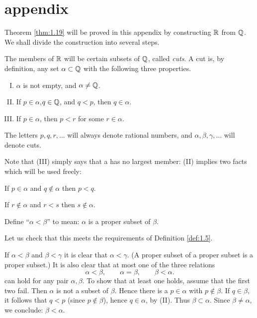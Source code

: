 \section*{appendix}
Theorem \ref{thm:1.19} will be proved in this appendix 
by constructing ${\protect\mathbb R}$ from ${\protect\mathbb Q}$. 
We shall divide the construction into several steps.

The members of ${\protect\mathbb R}$ will be certain subsets of ${\protect\mathbb Q}$, called \emph{cuts}. 
A cut is, by definition, 
any set $\alpha \subset {\protect\mathbb Q}$ with the following three properties.
\begin{enumerate}[(I)]
    \item $\alpha$ is not empty, and $\alpha \neq {\protect\mathbb Q}$.
    \item If $p\in \alpha$,$q \in {\protect\mathbb Q}$, and $q <p$, then $q \in \alpha$.
    \item If $p \in \alpha$, then $p <r$ for some $r\in \alpha$.
\end{enumerate}

The letters $p, q, r, ...$ will always denote rational numbers, 
and $\alpha, \beta, \gamma, ...$ will denote cuts.

Note that (III) simply says that a has no largest member: 
(II) implies two facts which will be used freely:

If $p\in\alpha$ and $q\not\in\alpha$ then $p<q$.

If $r\not\in \alpha$ and $r<s$ then $s\not\in \alpha$.

Define ``$\alpha < \beta$'' to mean: 
$\alpha$ is a proper subset of $\beta$.

Let us check that this meets the requirements of Definition \ref{def:1.5}.

If $\alpha < \beta$ and $\beta < \gamma$ it is clear that $\alpha < \gamma$. 
(A proper subset of a proper subset is a proper subset.) 
It is also clear that at most one of the three relations
\begin{equation*}
    \alpha < \beta, \qquad
    \alpha = \beta, \qquad
    \beta < \alpha.
\end{equation*}
can hold for any pair $\alpha, \beta$. 
To show that at least one holds, assume that the first two fail. 
Then $\alpha$ is not a subset of $\beta$. 
Hence there is a $p \in \alpha$ with $p \not\in \beta$. 
If $q \in \beta$, it follows that $q <p$ (since $p \not\in \beta$), 
hence $q \in \alpha$, by (II). 
Thus $\beta \subset \alpha$. 
Since $\beta \neq \alpha$, we conclude: $\beta < \alpha$.

